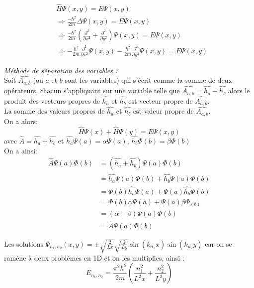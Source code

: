 \documentclass[../main.tex]{subfile}
\begin{document}
     $$
\begin{aligned}
     & \hat{H} \Psi(x, y) = E \Psi(x, y)\\
     &\Rightarrow \frac{-\hbar^2}{2m} \Delta \Psi(x, y) = E \Psi(x, y)\\
     &\Rightarrow \frac{-\hbar^2}{2m} (\frac{\partial^2}{\partial x^2} + \frac{\partial^2}{\partial y^2}) \Psi(x, y) = E \Psi(x, y)\\
     & \Rightarrow -\frac{\hbar^2}{2m}\frac{\partial^2}{\partial x^2} \Psi(x, y) - \frac{\hbar^2}{2m}\frac{\partial^2}{\partial y^2}\Psi(x, y) = E \Psi(x, y)
\end{aligned}
     $$


     \emph{Méthode de séparation des variables :}\\
     Soit $\hat{A_{a,b}}$ (où $a$ et $b$ sont les variables) qui s'écrit comme la somme de deux opérateurs,
     chacun s'appliquant sur une variable telle que 
     $\hat{A_{a,b}} = \hat{h_a} + \hat{h_b}$ 
     alors le produit des vecteurs propres de $\hat{h_a}$ et $\hat{h_b}$ est vecteur propre de $\hat{A_{a,b}}$.\\

     La somme des valeurs propres de $\hat{h_a}$ et $\hat{h_b}$ est valeur propre de $\hat{A_{a,b}}$.\\

     On a alors:\\
     $$\hat{H} \Psi(x) + \hat{H} \Psi(y) = E \Psi(x, y)$$
     avec $\hat{A} = \hat{h_a} + \hat{h_b}$ et $\hat{h_a} \Psi(a) = \alpha \Psi(a)$, $\hat{h_b} \Phi(b) = \beta \Phi(b)$\\

     On a ainsi:
     $$
\begin{aligned}
      \hat{A} \Psi(a) \Phi(b) &= (\hat{h_a} + \hat{h_b}) \Psi(a) \Phi(b)\\
      &= \hat{h_a} \Psi(a) \Phi(b) + \hat{h_b} \Psi(a) \Phi(b)\\
      &= \Phi(b) \hat{h_a} \Psi(a) + \Psi(a) \hat{h_b} \Phi(b)\\
      &= \Phi(b) \alpha \Psi(a) + \Psi(a) \beta \Phi_(b)\\
      &= (\alpha + \beta) \Psi(a) \Phi(b)\\
      &= \hat{A} \Psi(a) \Phi(b)
\end{aligned}
     $$

     Les solutions $\Psi_{n_1, n_2}(x, y) = \pm \sqrt{\frac{2}{Lx}} \sqrt{\frac{2}{Ly}} \sin(k_{n_1}x) \sin(k_{n_2}y)$
     car on se ramène à deux problèmes en 1D et on les multiplies, ainsi :
     $$E_{n_1, n_2} = \frac{\pi^2 \hbar^2}{2m} (\frac{n_1^2}{L^2 x} + \frac{n_2^2}{L^2 y})$$
\end{document}
